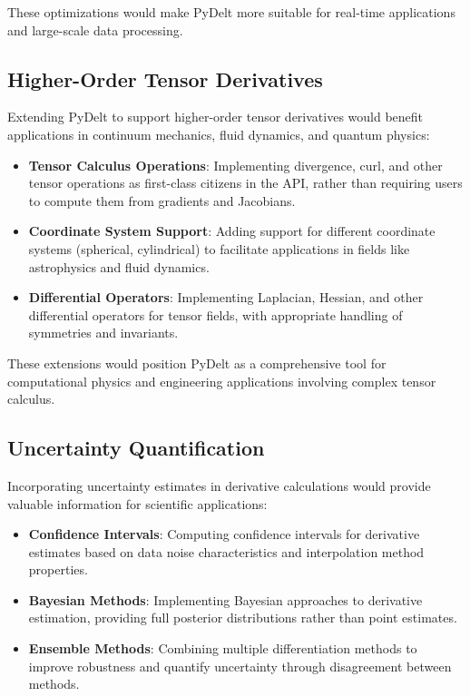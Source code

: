 \documentclass[11pt,a4paper]{article}
\begin{document}
These optimizations would make PyDelt more suitable for real-time applications and large-scale data processing.

\subsection{Higher-Order Tensor Derivatives}

Extending PyDelt to support higher-order tensor derivatives would benefit applications in continuum mechanics, fluid dynamics, and quantum physics:

\begin{itemize}
    \item \textbf{Tensor Calculus Operations}: Implementing divergence, curl, and other tensor operations as first-class citizens in the API, rather than requiring users to compute them from gradients and Jacobians.
    
    \item \textbf{Coordinate System Support}: Adding support for different coordinate systems (spherical, cylindrical) to facilitate applications in fields like astrophysics and fluid dynamics.
    
    \item \textbf{Differential Operators}: Implementing Laplacian, Hessian, and other differential operators for tensor fields, with appropriate handling of symmetries and invariants.
\end{itemize}

These extensions would position PyDelt as a comprehensive tool for computational physics and engineering applications involving complex tensor calculus.

\subsection{Uncertainty Quantification}

Incorporating uncertainty estimates in derivative calculations would provide valuable information for scientific applications:

\begin{itemize}
    \item \textbf{Confidence Intervals}: Computing confidence intervals for derivative estimates based on data noise characteristics and interpolation method properties.
    
    \item \textbf{Bayesian Methods}: Implementing Bayesian approaches to derivative estimation, providing full posterior distributions rather than point estimates.
    
    \item \textbf{Ensemble Methods}: Combining multiple differentiation methods to improve robustness and quantify uncertainty through disagreement between methods.
\end{itemize}
\end{document}

